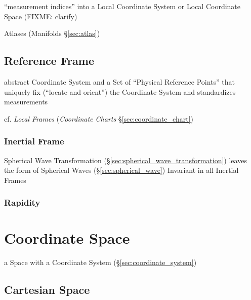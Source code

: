 ``measurement indices'' into a Local Coordinate System or Local Coordinate Space
(FIXME: clarify)

\fist Atlases (Manifolds \S\ref{sec:atlas})



\subsection{Reference Frame}\label{sec:reference_frame}

abstract Coordinate System and a Set of ``Physical Reference Points'' that
uniquely fix (``locate and orient'') the Coordinate System and standardizes
measurements

cf. \emph{Local Frames} (\emph{Coordinate Charts} \S\ref{sec:coordinate_chart})



\subsubsection{Inertial Frame}\label{sec:inertial_frame}

Spherical Wave Transformation (\S\ref{sec:spherical_wave_transformation})
leaves the form of Spherical Waves (\S\ref{sec:spherical_wave}) Invariant in
all Inertial Frames



\subsubsection{Rapidity}\label{sec:rapidity}



\section{Coordinate Space}\label{sec:coordinate_space}

a Space with a Coordinate System (\S\ref{sec:coordinate_system})



\subsection{Cartesian Space}\label{sec:cartesian_space}

